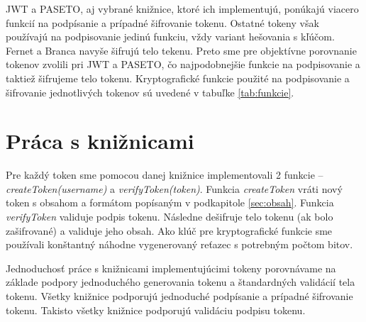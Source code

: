 JWT a PASETO, aj vybrané knižnice, ktoré ich implementujú, ponúkajú viacero funkcií na podpísanie a prípadné šifrovanie tokenu. Ostatné tokeny však používajú na podpisovanie jedinú funkciu, vždy variant hešovania s kľúčom. Fernet a Branca navyše šifrujú telo tekenu. Preto sme pre objektívne porovnanie tokenov zvolili pri JWT a PASETO, čo najpodobnejšie funkcie na podpisovanie a taktiež šifrujeme telo tokenu. Kryptografické funkcie použité na podpisovanie a šifrovanie jednotlivých tokenov sú uvedené v tabuľke \ref{tab:funkcie}.

\begin{table}
  \begin{center}
    \caption{Kryptografické funkcie na podpisovanie a šifrovanie tokenov}
    \label{tab:funkcie} %

  \end{center}
\end{table}

\section{Práca s knižnicami}

Pre každý token sme pomocou danej knižnice implementovali 2 funkcie -- \textit{createToken(username)} a \textit{verifyToken(token)}. Funkcia \textit{createToken} vráti nový token s obsahom a formátom popísaným v podkapitole \ref{sec:obsah}. Funkcia \textit{verifyToken} validuje podpis tokenu. Následne dešifruje telo tokenu (ak bolo zašifrované) a validuje jeho obsah. Ako klúč pre kryptografické funkcie sme používali konštantný náhodne vygenerovaný reťazec s potrebným počtom bitov.

Jednoduchosť práce s knižnicami implementujúcimi tokeny porovnávame na základe podpory jednoduchého generovania tokenu a štandardných validácií tela tokenu.
Všetky knižnice podporujú jednoduché podpísanie a prípadné šifrovanie tokenu. Takisto všetky knižnice podporujú validáciu podpisu tokenu. 

